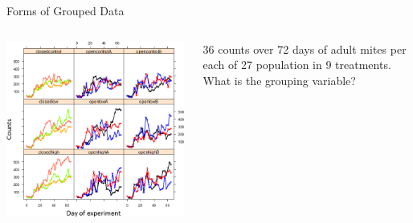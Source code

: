 \documentclass{beamer}
\begin{document}
\begin{frame}{Forms of Grouped Data}
\begin{columns}[onlytextwidth] 
  \begin{column}{0.5\textwidth}
      \begin{center}
    \includegraphics[width=0.99\textwidth]{lectures/day_1_intro_to_mems/figures/counts.png} %
  \end{center}
      \end{column}
    \hspace{0.02\textwidth} %
    \begin{column}{0.5\textwidth}
       36 counts over 72 days of adult mites per each of 27 population in 9 treatments. What is the grouping variable? 
    \end{column}
\end{columns}

  \end{frame}
\end{document}
